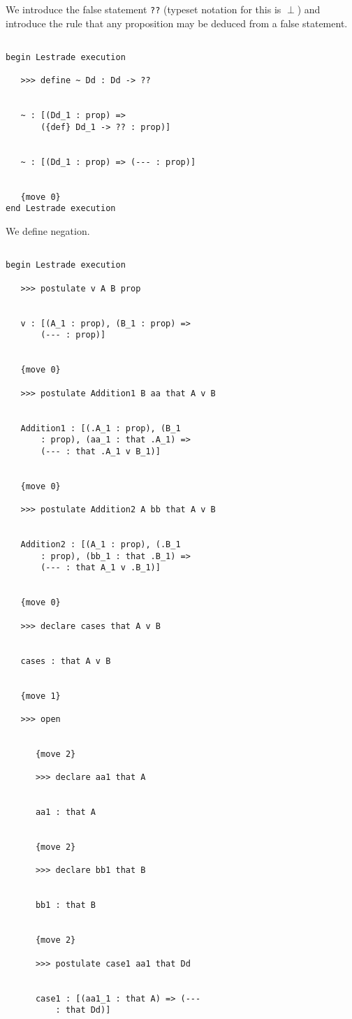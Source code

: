 \documentclass[12pt]{article}
\begin{document}
We introduce the false statement {\tt ??} (typeset notation for this is $\perp$) and introduce the rule that any proposition may be deduced from a false statement.

\begin{verbatim}

begin Lestrade execution

   >>> define ~ Dd : Dd -> ??


   ~ : [(Dd_1 : prop) => 
       ({def} Dd_1 -> ?? : prop)]


   ~ : [(Dd_1 : prop) => (--- : prop)]


   {move 0}
end Lestrade execution
\end{verbatim}

We define negation.

\begin{verbatim}

begin Lestrade execution

   >>> postulate v A B prop


   v : [(A_1 : prop), (B_1 : prop) => 
       (--- : prop)]


   {move 0}

   >>> postulate Addition1 B aa that A v B


   Addition1 : [(.A_1 : prop), (B_1 
       : prop), (aa_1 : that .A_1) => 
       (--- : that .A_1 v B_1)]


   {move 0}

   >>> postulate Addition2 A bb that A v B


   Addition2 : [(A_1 : prop), (.B_1 
       : prop), (bb_1 : that .B_1) => 
       (--- : that A_1 v .B_1)]


   {move 0}

   >>> declare cases that A v B


   cases : that A v B


   {move 1}

   >>> open


      {move 2}

      >>> declare aa1 that A


      aa1 : that A


      {move 2}

      >>> declare bb1 that B


      bb1 : that B


      {move 2}

      >>> postulate case1 aa1 that Dd


      case1 : [(aa1_1 : that A) => (--- 
          : that Dd)]



\end{verbatim}
\end{document}
